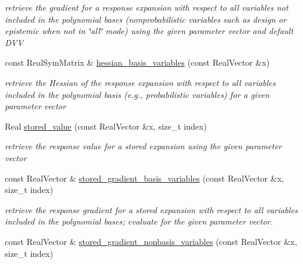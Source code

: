 \begin{DoxyCompactItemize}
\begin{DoxyCompactList}\small\item\em retrieve the gradient for a response expansion with respect to all variables not included in the polynomial bases (nonprobabilistic variables such as design or epistemic when not in \char`\"{}all\char`\"{} mode) using the given parameter vector and default D\+VV \end{DoxyCompactList}\item 
const Real\+Sym\+Matrix \& \hyperlink{classPecos_1_1RegressOrthogPolyApproximation_a830729654265d84af637960f8c63f2bc}{hessian\+\_\+basis\+\_\+variables} (const Real\+Vector \&x)\label{classPecos_1_1RegressOrthogPolyApproximation_a830729654265d84af637960f8c63f2bc}

\begin{DoxyCompactList}\small\item\em retrieve the Hessian of the response expansion with respect to all variables included in the polynomial basis (e.\+g., probabilistic variables) for a given parameter vector \end{DoxyCompactList}\item 
Real \hyperlink{classPecos_1_1RegressOrthogPolyApproximation_a1abe918dbdc66ac0fde85f1ab3c061af}{stored\+\_\+value} (const Real\+Vector \&x, size\+\_\+t index)\label{classPecos_1_1RegressOrthogPolyApproximation_a1abe918dbdc66ac0fde85f1ab3c061af}

\begin{DoxyCompactList}\small\item\em retrieve the response value for a stored expansion using the given parameter vector \end{DoxyCompactList}\item 
const Real\+Vector \& \hyperlink{classPecos_1_1RegressOrthogPolyApproximation_a7689fc058e2efdde6ce4dfe898864592}{stored\+\_\+gradient\+\_\+basis\+\_\+variables} (const Real\+Vector \&x, size\+\_\+t index)\label{classPecos_1_1RegressOrthogPolyApproximation_a7689fc058e2efdde6ce4dfe898864592}

\begin{DoxyCompactList}\small\item\em retrieve the response gradient for a stored expansion with respect to all variables included in the polynomial bases; evaluate for the given parameter vector. \end{DoxyCompactList}\item 
const Real\+Vector \& \hyperlink{classPecos_1_1RegressOrthogPolyApproximation_af0c9184d9a0da7b0e3d0d3ecbfc8f434}{stored\+\_\+gradient\+\_\+nonbasis\+\_\+variables} (const Real\+Vector \&x, size\+\_\+t index)\label{classPecos_1_1RegressOrthogPolyApproximation_af0c9184d9a0da7b0e3d0d3ecbfc8f434}


\end{DoxyCompactItemize}
